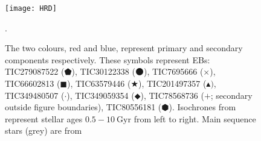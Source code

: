 \begin{figure}[H]
    \centering
    \texttt{[image: HRD]}
    \caption{The two colours, red and blue, represent primary and secondary components respectively. These symbols represent EBs: TIC279087522 ($\pentagonblack$), TIC30122338 ($\mdblkcircle$), TIC7695666 ($\times$), TIC66602813 ($\mdblksquare$), TIC63579446 ($\bigstar$), TIC201497357 ($\blacktriangle)$, TIC349480507 ($\cdot$), TIC349059354 ($\mdblkdiamond$), TIC78568736 ($+$; secondary outside figure boundaries), TIC80556181 ($\varhexagonblack$). Isochrones from \citet{Dotter16,Choi16,Paxton18} represent stellar ages $0.5 - 10 \mathrm{\ Gyr}$ from left to right. Main sequence stars (grey) are from \citet{Gaia18}}.
    \label{fig:CMD}
\end{figure}